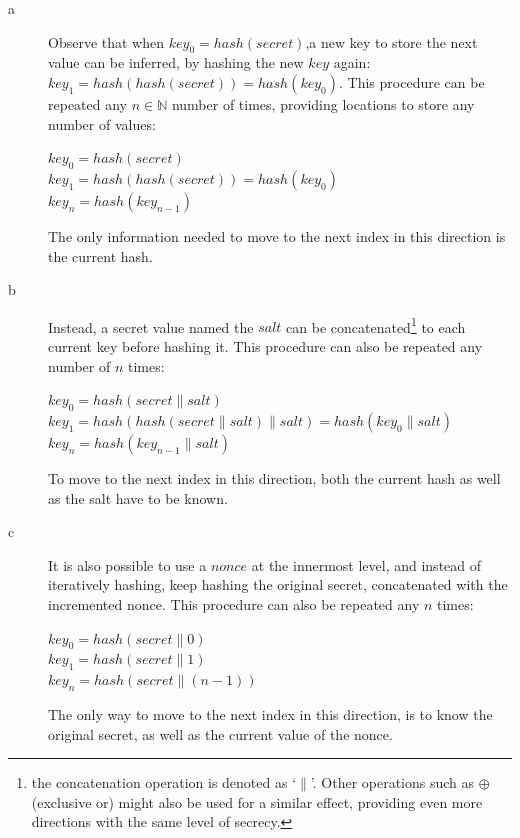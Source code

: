 \documentclass[a4paper]{article}
\begin{document}
\begin{description}
	

	\item[\textcircled{a}] Observe that when  $key_0 = hash(secret)$,a new key to store the next value can be inferred, by hashing the new $key$ again: $key_1 = hash(hash(secret)) = hash(key_0)$. This procedure can be repeated any $n \in \mathbb{N}$ number of times, providing locations to store any number of values: 
	
	$key_0 = hash(secret)$\\
	$key_1 = hash(hash(secret)) = hash(key_0)$\\
	$key_n = hash(key_{n-1})$
	
	The only information needed to move to the next index in this direction is the current hash.
	
	
	\item[\textcircled{b}] Instead, a secret value named the $salt$ can be concatenated\footnote{the concatenation operation is denoted as `$\parallel$'. Other operations such as $\oplus$ (exclusive or) might also be used for a similar effect, providing even more directions with the same level of secrecy.} to each current key before hashing it. This procedure can also be repeated any number of $n$ times: 
	
   	$key_0 = hash(secret \parallel salt)$ \\	
	$key_1 = hash(hash(secret \parallel salt) \parallel salt) = hash(key_0\parallel salt)$\\
	$key_n = hash(key_{n-1} \parallel salt)$	 
	
	To move to the next index in this direction, both the current hash as well as the salt have to be known.
	 
	\item[\textcircled{c}] It is also possible to use a $nonce$ at the innermost level, and instead of iteratively hashing, keep hashing the original secret, concatenated with the incremented nonce. This procedure can also be repeated any $n$ times:
	
	$key_0 = hash(secret \parallel 0)$ \\
	$key_1 = hash(secret \parallel 1)$ \\
	$key_n = hash(secret \parallel (n-1))$
	
	The only way to move to the next index in this direction, is to know the original secret, as well as the current value of the nonce.

\end{description}
\end{document}
